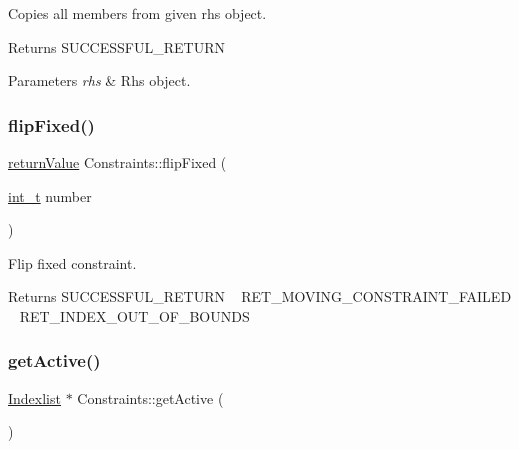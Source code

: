 Copies all members from given rhs object. \begin{DoxyReturn}{Returns}
S\+U\+C\+C\+E\+S\+S\+F\+U\+L\+\_\+\+R\+E\+T\+U\+RN 
\end{DoxyReturn}

\begin{DoxyParams}{Parameters}
{\em rhs} & Rhs object. \\
\hline
\end{DoxyParams}
\mbox{\label{class_constraints_a2d92efd44ce48f4b4ac04c21c5fda6e6}} 
\subsubsection{\texorpdfstring{flip\+Fixed()}{flipFixed()}}
{\footnotesize\ttfamily \hyperlink{_message_handling_8hpp_a81d556f613bfbabd0b1f9488c0fa865e}{return\+Value} Constraints\+::flip\+Fixed (\begin{DoxyParamCaption}\item[{\hyperlink{_types_8hpp_ab6fd6105e64ed14a0c9281326f05e623}{int\+\_\+t}}]{number }\end{DoxyParamCaption})}

Flip fixed constraint. \begin{DoxyReturn}{Returns}
S\+U\+C\+C\+E\+S\+S\+F\+U\+L\+\_\+\+R\+E\+T\+U\+RN ~\newline
 R\+E\+T\+\_\+\+M\+O\+V\+I\+N\+G\+\_\+\+C\+O\+N\+S\+T\+R\+A\+I\+N\+T\+\_\+\+F\+A\+I\+L\+ED ~\newline
 R\+E\+T\+\_\+\+I\+N\+D\+E\+X\+\_\+\+O\+U\+T\+\_\+\+O\+F\+\_\+\+B\+O\+U\+N\+DS 
\end{DoxyReturn}
\mbox{\label{class_constraints_ad72b2d0ba9bf79297ed39642e2d18c77}} 
\subsubsection{\texorpdfstring{get\+Active()}{getActive()}}
{\footnotesize\ttfamily \hyperlink{class_indexlist}{Indexlist} $\ast$ Constraints\+::get\+Active (\begin{DoxyParamCaption}{ }\end{DoxyParamCaption})\hspace{0.3cm}{\ttfamily [inline]}}

